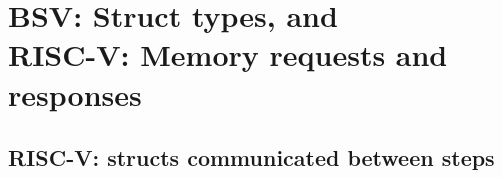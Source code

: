 

\chapter{BSV: Struct types, and\\
RISC-V: Memory requests and responses}


\setcounter{page}{1}
\renewcommand{\thepage}{\arabic{chapter}-\arabic{page}}

\label{ch_Structs_Mem_Reqs_Rsps}


\section{RISC-V: structs communicated between steps}


